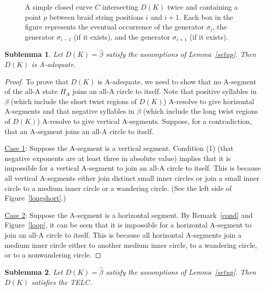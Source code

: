 \documentclass{article}
\newtheorem{sublemma}{Sublemma}[section]
\begin{document}
\begin{figure}
	\centering
	  \def\svgwidth{1.5in}
		  
	\caption{A simple closed curve $C$ intersecting $D(K)$ twice and containing a point $p$ between braid string positions $i$ and $i+1$. Each box in the figure represents the eventual occurrence of the generator $\sigma_{i}$, the generator $\sigma_{i-1}$ (if it exists), and the generator $\sigma_{i+1}$ (if it exists).}
	\label{primeclose}
\end{figure}



\begin{sublemma} \label{sublemma3} Let $D(K)=\widehat{\beta}$ satisfy the assumptions of Lemma~\ref{setup}. Then $D(K)$ is A-adequate.  
\end{sublemma}

\begin{proof} To prove that $D(K)$ is A-adequate, we need to show that no A-segment of the all-A state $H_{A}$ joins an all-A circle to itself. Note that positive syllables in $\beta$ (which include the short twist regions of $D(K)$) A-resolve to give horizontal A-segments and that negative syllables in $\beta$ (which include the long twist regions of $D(K)$) A-resolve to give vertical A-segments. Suppose, for a contradiction, that an A-segment joins an all-A circle to itself. 

\bigskip

\noindent \underline{Case 1}: Suppose the A-segment is a vertical segment. Condition (1) (that negative exponents are at least three in absolute value) implies that it is impossible for a vertical A-segment to join an all-A circle to itself. This is because all vertical A-segments either join distinct small inner circles or join a small inner circle to a medium inner circle or a wandering circle. (See the left side of Figure~\ref{longshort}.)

\bigskip  

\noindent \underline{Case 2}: Suppose the A-segment is a horizontal segment. By Remark~\ref{cond} and Figure~\ref{loop}, it can be seen that it is impossible for a horizontal A-segment to join an all-A circle to itself. This is because all horizontal A-segments join a medium inner circle either to another medium inner circle, to a wandering circle, or to a nonwandering circle. 
\end{proof}

\begin{sublemma} \label{sublemma4} Let $D(K)=\widehat{\beta}$ satisfy the assumptions of Lemma~\ref{setup}. Then $D(K)$ satisfies the TELC.
\end{sublemma}
\end{document}
